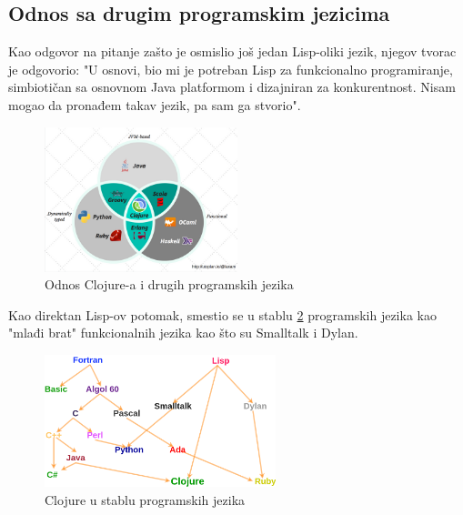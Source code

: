 \subsection{Odnos sa drugim programskim jezicima}
\label{subsec:drugijezici}

Kao odgovor na pitanje zašto je osmislio još jedan Lisp-oliki jezik, njegov tvorac je odgovorio: "U osnovi, bio mi je potreban Lisp za funkcionalno programiranje, simbiotičan sa osnovnom Java platformom i dizajniran za konkurentnost. Nisam mogao da pronađem takav jezik, pa sam ga stvorio"\cite{clojure}.


 \begin{figure}[h]
     \centering
     \includegraphics[width=0.5\textwidth]{Slike/clojure.png}
     \caption{Odnos Clojure-a i drugih programskih jezika}
     \label{fig:clojure_ostali}
 \end{figure}

Kao direktan Lisp-ov potomak, smestio se u stablu \ref{fig:stablo} programskih jezika  kao "mlađi brat" funkcionalnih jezika kao što su Smalltalk i Dylan.

\begin{figure}[ht]
    \includegraphics[width=0.6\textwidth]{Slike/stablo.png}
    \centering
    \caption{Clojure u stablu programskih jezika}
    \label{fig:stablo}
\end{figure}
